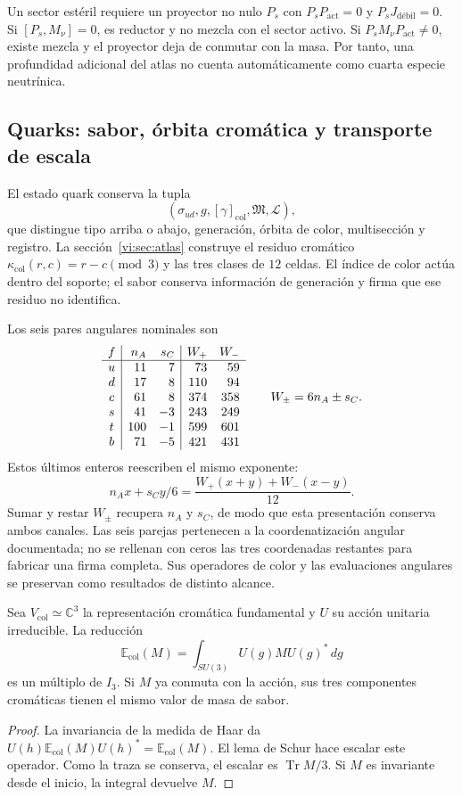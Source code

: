 Un sector estéril requiere un proyector no nulo \(P_s\) con
\(P_sP_{\mathrm{act}}=0\) y \(P_sJ_{\mathrm{débil}}=0\).
Si \([P_s,M_\nu]=0\), es reductor y no mezcla con el sector activo.
Si \(P_sM_\nu P_{\mathrm{act}}\ne0\), existe mezcla y el proyector
deja de conmutar con la masa. Por tanto, una profundidad adicional del
atlas no cuenta automáticamente como cuarta especie neutrínica.

\subsection{Quarks: sabor, órbita cromática y transporte de escala}
\label{vi:subsec:quarks-familias}

El estado quark conserva la tupla
\[
 (\sigma_{ud},g,[\gamma]_{\mathrm{col}},\mathfrak M,\mathscr L),
\]
que distingue tipo arriba o abajo, generación, órbita de color,
multisección y registro. La sección~\ref{vi:sec:atlas} construye el
residuo cromático \(\kappa_{\mathrm{col}}(r,c)=r-c\pmod3\) y las
tres clases de \(12\) celdas. El índice de color actúa dentro del
soporte; el sabor conserva información de generación y firma que ese
residuo no identifica.

Los seis pares angulares nominales son
\[
\begin{array}{c|r r|r r}
 f&n_A&s_C&W_+&W_-\\\hline
 u&11&7&73&59\\
 d&17&8&110&94\\
 c&61&8&374&358\\
 s&41&-3&243&249\\
 t&100&-1&599&601\\
 b&71&-5&421&431
\end{array}
\qquad W_\pm=6n_A\pm s_C.
\]
Estos últimos enteros reescriben el mismo exponente:
\[
 n_Ax+s_Cy/6
 =\frac{W_+(x+y)+W_-(x-y)}{12}.
\]
Sumar y restar \(W_\pm\) recupera \(n_A\) y \(s_C\), de modo que
esta presentación conserva ambos canales. Las seis parejas pertenecen
a la coordenatización angular documentada; no se rellenan con ceros las tres
coordenadas restantes para fabricar una firma completa. Sus operadores
de color y las evaluaciones angulares se preservan como resultados de
distinto alcance.

\begin{proposition}
\label{vi:prop:masa-color}
Sea \(V_{\mathrm{col}}\simeq\mathbb C^3\) la representación cromática
fundamental y \(U\) su acción unitaria irreducible. La reducción
\[
 \mathbb E_{\mathrm{col}}(M)=
 \int_{SU(3)}U(g)MU(g)^*\,dg
\]
es un múltiplo de \(I_3\). Si \(M\) ya conmuta con la acción, sus tres
componentes cromáticas tienen el mismo valor de masa de sabor.
\end{proposition}
\begin{proof}
La invariancia de la medida de Haar da
\(U(h)\mathbb E_{\mathrm{col}}(M)U(h)^*=
\mathbb E_{\mathrm{col}}(M)\). El lema de Schur hace escalar este
operador. Como la traza se conserva, el escalar es
\(\operatorname{Tr}M/3\). Si \(M\) es invariante desde el inicio,
la integral devuelve \(M\).
\end{proof}

